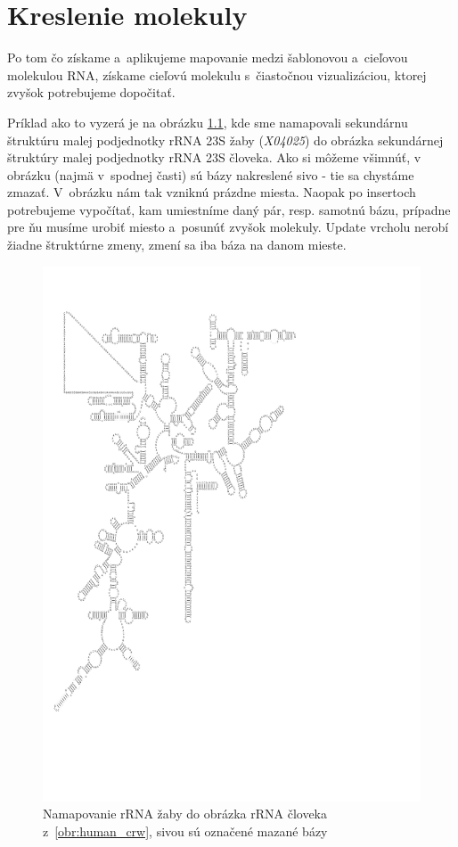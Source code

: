 \newcommand{\degree}{\ensuremath{^{\circ}}}

\chapter{Kreslenie molekuly}

Po tom čo získame a~aplikujeme mapovanie medzi šablonovou a~cieľovou molekulou RNA,
získame cieľovú molekulu s~čiastočnou vizualizáciou, ktorej zvyšok potrebujeme dopočitať.

Príklad ako to vyzerá je na obrázku \ref{obr:frog_to_human}, kde sme
namapovali sekundárnu štruktúru malej podjednotky rRNA 23S žaby (\textit{X04025}) do
obrázka sekundárnej štruktúry malej podjednotky rRNA 23S človeka.
Ako si môžeme všimnúť, v obrázku (najmä v~spodnej časti) sú bázy nakreslené
sivo - tie sa chystáme zmazať. V~obrázku nám tak vzniknú prázdne miesta.
Naopak po insertoch potrebujeme vypočítať, kam umiestníme daný pár,
resp. samotnú bázu, prípadne pre ňu musíme urobiť miesto a~posunúť zvyšok
molekuly. Update vrcholu nerobí žiadne štruktúrne zmeny, zmení sa iba
báza na danom mieste.

\begin{figure}
  \centering
  \includegraphics[clip, trim=0 5cm 6cm 2cm, width=1\textwidth]{../img/african_frog-to-human-mapped}
  \caption{Namapovanie rRNA žaby do obrázka rRNA človeka z~\ref{obr:human_crw}, sivou sú označené mazané bázy}
  \label{obr:frog_to_human}
\end{figure}

